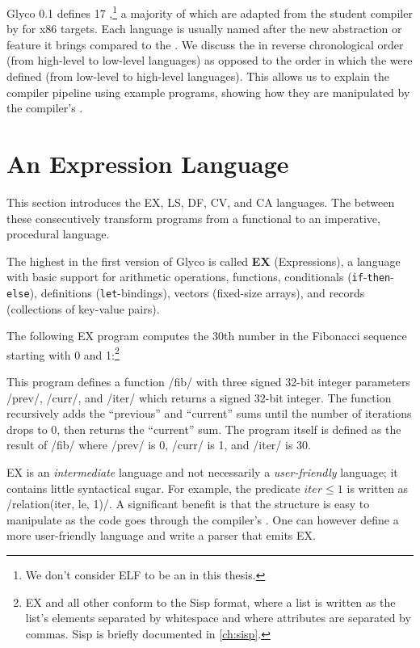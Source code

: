 \documentclass[main.tex]{subfiles}
\begin{document}
Glyco 0.1 defines 17 ,\footnote{We don't consider ELF to be an  in this thesis.} a majority of which are adapted from the student compiler by \citet{compcourse} for x86 targets. Each language is usually named after the new abstraction or feature it brings compared to the . We discuss the  in reverse chronological order (from high-level to low-level languages) as opposed to the order in which the  were defined (from low-level to high-level languages). This allows us to explain the compiler pipeline using example programs, showing how they are manipulated by the compiler's .

\newpage

\section{An Expression Language} \label{sct:ex}

This section introduces the EX, LS, DF, CV, and CA languages. The  between these  consecutively transform programs from a functional to an imperative, procedural language.

The highest  in the first version of Glyco is called \textbf{EX} (Expressions), a language with basic support for arithmetic operations, functions, conditionals (\texttt{if}-\texttt{then}-\texttt{else}), definitions (\texttt{let}-bindings), vectors (fixed-size arrays), and records (collections of key-value pairs).

The following EX program computes the 30th number in the Fibonacci sequence starting with 0 and 1:\footnote{EX and all other  conform to the Sisp format, where a list is written as the list's elements separated by whitespace and where attributes are separated by commas. Sisp is briefly documented in \cref{ch:sisp}.}

This program defines a function \iil/fib/ with three signed 32-bit integer parameters \iil/prev/, \iil/curr/, and \iil/iter/ which returns a signed 32-bit integer. The function recursively adds the \enquote{previous} and \enquote{current} sums until the number of iterations drops to 0, then returns the \enquote{current} sum. The program itself is defined as the result of \iil/fib/ where \iil/prev/ is 0, \iil/curr/ is 1, and \iil/iter/ is 30.

EX is an \emph{intermediate} language and not necessarily a \emph{user-friendly} language; it contains little syntactical sugar. For example, the predicate $ \textit{iter} \le 1 $ is written as \iil/relation(iter, le, 1)/. A significant benefit is that the structure is easy to manipulate as the code goes through the compiler's . One can however define a more user-friendly language and write a parser that emits EX.
\end{document}
